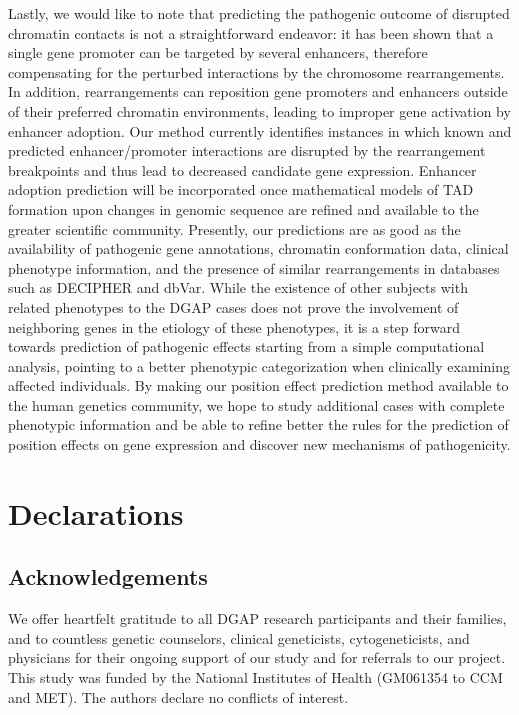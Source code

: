 \documentclass[a4paper,twoside=true,openright,parskip=full,chapterprefix=true,11pt,headings=normal,bibliography=totoc,listof=totoc,titlepage=on,captions=tableabove,draft=false]{scrreprt}
\theoremstyle{definition}
\theoremstyle{definition}
\theoremstyle{definition}
\theoremstyle{remark}
\begin{document}
Lastly, we would like to note that predicting the pathogenic outcome of
disrupted chromatin contacts is not a straightforward endeavor: it has
been shown that a single gene promoter can be targeted by several
enhancers,\citep{Thurman2012} therefore compensating for the perturbed
interactions by the chromosome rearrangements. In addition,
rearrangements can reposition gene promoters and enhancers outside of
their preferred chromatin environments, leading to improper gene
activation by enhancer adoption.\citep{Lupianez2015} Our method
currently identifies instances in which known and predicted
enhancer/promoter interactions are disrupted by the rearrangement
breakpoints and thus lead to decreased candidate gene expression.
Enhancer adoption prediction will be incorporated once mathematical
models of TAD formation upon changes in genomic sequence are refined and
available to the greater scientific community. Presently, our
predictions are as good as the availability of pathogenic gene
annotations, chromatin conformation data, clinical phenotype
information, and the presence of similar rearrangements in databases
such as DECIPHER and dbVar. While the existence of other subjects with
related phenotypes to the DGAP cases does not prove the involvement of
neighboring genes in the etiology of these phenotypes, it is a step
forward towards prediction of pathogenic effects starting from a simple
computational analysis, pointing to a better phenotypic categorization
when clinically examining affected individuals. By making our position
effect prediction method available to the human genetics community, we
hope to study additional cases with complete phenotypic information and
be able to refine better the rules for the prediction of position
effects on gene expression and discover new mechanisms of pathogenicity.

\hypertarget{declarations-1}{%
\section*{Declarations}\label{declarations-1}}

\hypertarget{acknowledgements-1}{%
\subsection*{Acknowledgements}\label{acknowledgements-1}}

We offer heartfelt gratitude to all DGAP research participants and their
families, and to countless genetic counselors, clinical geneticists,
cytogeneticists, and physicians for their ongoing support of our study
and for referrals to our project. This study was funded by the National
Institutes of Health (GM061354 to CCM and MET). The authors declare no
conflicts of interest.
\end{document}
